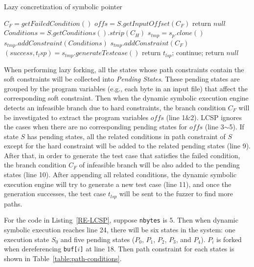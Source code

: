  

\begin{algorithm}
 \LinesNumbered
  \caption{Lazy concretization of symbolic pointer}
  \label{LCSP}
  $C_F = getFailedCondition()$\;
  $offs = S.getInputOffset(C_F)$\;
  {
    return $null$\;
  }
  $Conditions = S.getConditions().strip(C_H)$\;
  {
    $s_{tmp} = s_p.clone()$\;
    $s_{tmp}.addConstraint(Conditions)$\;
    $s_{tmp}.addConstraint(C_F)$\;
    $(success, t_lsp) = s_{tmp}.generateTestcase()$\;
    {
      return $t_{lsp}$;
    } {
      continue;
    }
  }
  return $null$\;
\end{algorithm}

When performing lazy forking, all the states whose path constraints contain the soft constraints will be collected into \emph{Pending States}. These pending states are grouped by the program variables (e.g., each byte in an input file) that affect the corresponding soft constraint. 
Then when the dynamic symbolic execution engine detects an infeasible branch due to hard constraints, the branch condition $C_F$ will be investigated to extract the program variables $offs$ (line 1\&2). 
 LCSP ignores the cases when there are no corresponding pending states for $offs$ (line 3$\sim$5). 
 If state $S$ has pending states, all the related conditions in path constraint of $S$ except for the hard constraint will be added to the related pending states (line 9).
 After that, in order to generate the test case that satisfies the failed condition, the branch condition $C_F$ of infeasible branch will be also added to the pending states (line 10).
 After appending all related conditions, the dynamic symbolic execution engine will try to generate a new test case (line 11), and once the generation successes, the test case $t_{lsp}$ will be sent to the fuzzer to find more paths.

For the code in Listing~\ref{RE-LCSP}, suppose \texttt{nbytes} is 5. Then when dynamic symbolic execution reaches line 24, there will be six states in the system: one execution state $S_0$ and five pending states ($P_0$, $P_1$, $P_2$, $P_3$, and $P_4$). $P_i$ is forked when dereferencing \texttt{buf[$i$]} at line 18.
Then path constraint for each states is shown in Table~\ref{table:path-conditions}.

